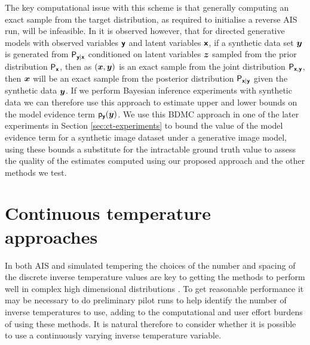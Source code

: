 The key computational issue with this scheme is that generally computing an exact sample from the target distribution, as required to initialise a reverse \ac{AIS} run, will be infeasible. In \citep{grosse2015sandwiching} it is observed however, that for directed generative models with observed variables $\boldsymbol{\mathsf{y}}$ and latent variables $\boldsymbol{\mathsf{x}}$, if a synthetic data set $\boldsymbol{y}$ is generated from $\mathsf{P}_{\boldsymbol{\mathsf{y}}|\boldsymbol{\mathsf{x}}}$ conditioned on latent variables $\boldsymbol{z}$ sampled from the prior distribution $\mathsf{P}_{\boldsymbol{\mathsf{x}}}$, then as $(\boldsymbol{x},\boldsymbol{y})$ is an exact sample from the joint distribution $\mathsf{P}_{\boldsymbol{\mathsf{x}},\boldsymbol{\mathsf{y}}}$, then $\boldsymbol{x}$ will be an exact sample from the posterior distribution $\mathsf{P}_{\boldsymbol{\mathsf{x}}|\boldsymbol{\mathsf{y}}}$ given the synthetic data $\boldsymbol{y}$. If we perform Bayesian inference experiments with synthetic data we can therefore use this approach to estimate upper and lower bounds on the model evidence term $\mathsf{p}_{\boldsymbol{\mathsf{y}}}(\boldsymbol{y})$. We use this \ac{BDMC} approach in one of the later experiments in Section \ref{sec:ct-experiments} to bound the value of the model evidence term for a synthetic image dataset under a generative image model, using these bounds a substitute for the intractable ground truth value to assess the quality of the estimates computed using our proposed approach and the other methods we test. 


\section{Continuous temperature approaches}

In both \ac{AIS} and simulated tempering the choices of the number and spacing of the discrete inverse temperature values are key to getting the methods to perform well in complex high dimensional distributions \citep{neal1996sampling,behrens2012tuning,betancourt2014adiabatic}. To get reasonable performance it may be necessary to do preliminary pilot runs to help identify the number of inverse temperatures to use, adding to the computational and user effort burdens of using these methods. It is natural therefore to consider whether it is possible to use a continuously varying inverse temperature variable. %


